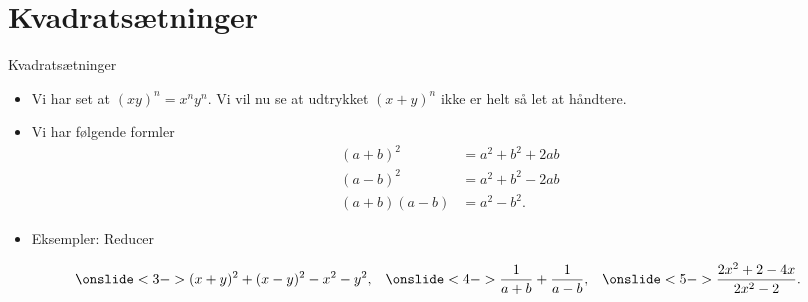\section{Kvadratsætninger}
\begin{frame}{Kvadratsætninger}
\begin{itemize}
		\setlength\itemsep{1em}
	\item<1-> Vi har set at $(xy)^n=x^ny^n$. Vi vil nu se at udtrykket $(x+y)^n$ ikke er helt så let at håndtere. 
	\item<2-> Vi har følgende formler
	\begin{align*}
	(a+b)^2&=a^2+b^2+2ab\\
	(a-b)^2&=a^2+b^2-2ab\\
	(a+b)(a-b)&=a^2-b^2.
	\end{align*}
	\item<3-> Eksempler: Reducer
\end{itemize}
\begin{align*}
\onslide<3->{(x+y)^2+(x-y)^2-x^2-y^2,}&&\onslide<4->{ \frac{1}{a+b}+\frac{1}{a-b},}&&\onslide<5->{\frac{2x^2+2-4x}{2x^2-2}.}
\end{align*}
\end{frame}

